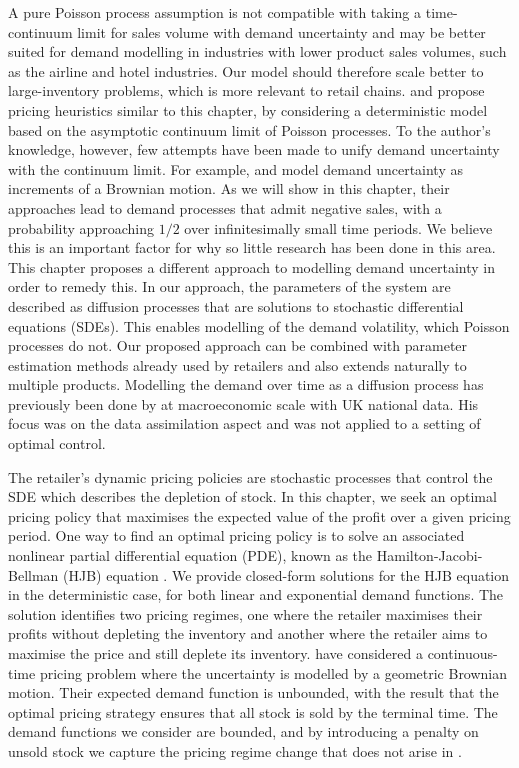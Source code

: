 \documentclass[main.tex]{subfiles}
\begin{document}
A pure Poisson process assumption is not compatible with taking a
time-continuum limit for sales volume with demand uncertainty and may
be better suited for demand
modelling in industries with lower product sales volumes, such as
the airline and hotel industries. Our model should therefore scale
better to large-inventory problems, which is more relevant to retail chains.
\citet{maglaras2006dynamic} and \citet{schlosser2015dynamic1,schlosser2015dynamic2}
propose pricing heuristics similar to this
chapter, by considering a deterministic model based on the asymptotic continuum
limit of Poisson processes.
To the author's knowledge, however,
few attempts have been made to unify demand uncertainty with the continuum
limit. For example, \citet{raman1995optimal} and \citet{wu2016dynamic} model
demand uncertainty as increments of a Brownian motion. As we will show
in this chapter, their approaches lead to demand processes that admit
negative sales, with a probability approaching $1/2$ over
infinitesimally small time periods. We believe this is an important
factor for why so little research has been done in this area.
This chapter proposes a different
approach to modelling demand uncertainty in order to remedy this.
In our approach, the parameters of the system are described
as diffusion processes that are solutions to
stochastic differential equations (SDEs).
This enables modelling of the demand volatility, which Poisson
processes do not.
Our proposed approach can be combined with parameter estimation
methods already used by retailers
and also extends naturally to multiple products.
Modelling the demand over time as a diffusion process has previously
been done by \citet{chambers1992estimation} at macroeconomic scale
with UK national data. His focus was on the data assimilation aspect and was not
applied to a setting of optimal control.

The retailer's dynamic pricing policies are stochastic processes that
control the SDE which describes the depletion of stock. In this
chapter, we seek an optimal pricing policy that maximises the expected value of
the profit over a given pricing period.
One way to find an optimal pricing policy is to solve an associated nonlinear partial
differential equation (PDE), known as the Hamilton-Jacobi-Bellman (HJB) equation
\citep{pham2009continuous}.
We provide closed-form solutions for the HJB equation in the
deterministic case, for both linear
and exponential demand functions. The solution identifies two pricing
regimes, one where the retailer maximises their profits without
depleting the inventory and another
where the retailer aims to maximise the price and still deplete
its inventory.
\citet{xu2006monopolistic} have considered a continuous-time pricing
problem where the uncertainty is modelled by a geometric Brownian
motion. Their expected demand function is unbounded, with the result that the
optimal pricing strategy ensures that all stock is sold by the
terminal time. The demand functions we consider are bounded, and by
introducing a penalty on unsold stock we capture the pricing regime
change that does not arise in \citet{xu2006monopolistic}.
\end{document}
